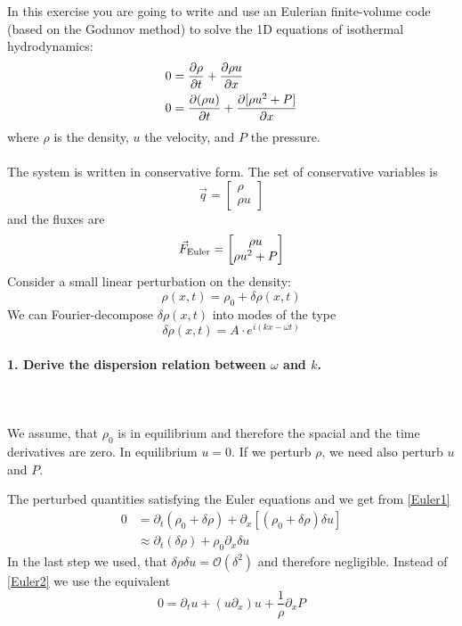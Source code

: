 In this exercise you are going to write and
use an Eulerian finite-volume code (based on
the Godunov method) to solve the 1D equations
of isothermal hydrodynamics:
\begin{align}
    0&=
    \frac{\partial \rho}{\partial t}+
    \frac{\partial \rho u}{\partial x} \\ \label{Euler1}
    0&=
    \frac{\partial (\rho u)}{\partial t}+
    \frac{\partial [\rho u^2+P]}{\partial x} \\ \label{Euler2}
\end{align}
where $\rho$ is the density, $u$ the velocity,
and $P$ the pressure. \\
\\
The system is written in
conservative form. The set of conservative
variables is
\begin{equation}
    \vec q=
    \begin{bmatrix}
        \rho \\ \rho u
    \end{bmatrix}
\end{equation}
and the fluxes are
\begin{equation}
    \vec F_\textnormal{Euler}=
    \begin{bmatrix}
        \rho u \\ \rho u^2+P
    \end{bmatrix}
\end{equation}
Consider a small linear perturbation on
the density:
\begin{equation}
    \rho(x,t)=
    \rho_0+\delta\rho(x,t)
\end{equation}
We can Fourier-decompose $\delta\rho(x,t)$
into modes of the type
\begin{equation}
    \delta\rho(x,t)
    =A\cdot e^{i(kx-\omega t)}
\end{equation}

\paragraph{1. Derive the dispersion relation
    between $\omega$ and $k$.
} \ \\
    \\
We assume, that $\rho_0$ is in equilibrium and therefore the spacial and the time derivatives are zero. In equilibrium $u=0$. If we perturb $\rho$, we need also perturb $u$ and $P$.

The perturbed quantities satisfying the Euler equations and we get from \eqref{Euler1}
 \begin{align}
 	0 &= \partial_t(\rho_0 + \delta \rho) + \partial_x [(\rho_0 + \delta \rho) \delta u]\\
 	&\approx \partial_t (\delta \rho)+ \rho_0 \partial_x \delta u
 	\label{App1}
 \end{align}
In the last step we used, that $\delta \rho \delta u = \mathcal{O}(\delta^2)$ and therefore negligible.
Instead of \eqref{Euler2} we use the equivalent
\begin{equation}
	0 = \partial_t u + (u \partial_x)u + \frac{1}{\rho} \partial_x P \end{equation}

